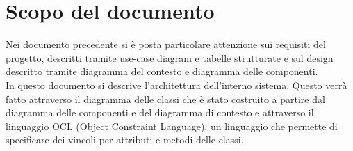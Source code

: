 \section*{Scopo del documento}
Nei documento precedente si è posta particolare attenzione sui requisiti del progetto, descritti tramite use-case diagram e tabelle strutturate e sul design descritto tramite diagramma del contesto e diagramma delle componenti. \\
In questo documento si descrive l'architettura dell'interno sistema. Questo verrà fatto attraverso il diagramma delle classi che è stato costruito a partire dal diagramma delle componenti e del diagramma di contesto e attraverso il linguaggio OCL (Object Constraint Language), un linguaggio che permette di specificare dei vincoli per attributi e metodi delle classi.
